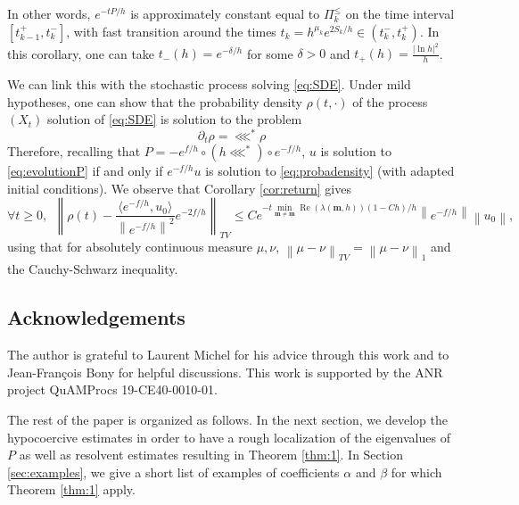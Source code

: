 \documentclass[12pt]{amsart}
\renewcommand{\Re}{\operatorname{Re}}
\def\<{\langle}
\def\>{\rangle}
\numberwithin{equation}{section}
\numberwithin{figure}{section}
\def\m{\mathbf{m}}
\def\um{\underline{\m}}
\newcommand{\vvert}[1]{\left\lVert#1\right\rVert}
\begin{document}
In other words, $e^{-tP/h}$ is approximately constant equal to $\Pi^\leq_k$ on the time interval $[t^+_{k-1},t^-_k]$, with fast transition around the times $t_k = h^{\mu_k}e^{2S_k/h}\in(t^-_k,t^+_k)$. In this corollary, one can take $t_-(h) = e^{-\delta/h}$ for some $\delta>0$ and $t_+(h) = \frac{|\ln h|^2}{h}$.

We can link this with the stochastic process solving \eqref{eq:SDE}. Under mild hypotheses, one can show that the probability density $\rho(t,\cdot)$ of the process $(X_t)$ solution of \eqref{eq:SDE} is solution to the problem
\begin{equation}\label{eq:probadensity}
\partial_t \rho = \lll^*\rho
\end{equation}
Therefore, recalling that $P = -e^{f/h}\circ(h\lll^*)\circ e^{-f/h}$, $u$ is solution to \eqref{eq:evolutionP} if and only if $e^{-f/h}u$ is solution to \eqref{eq:probadensity} (with adapted initial conditions). We observe that Corollary \ref{cor:return} gives
\begin{equation*}
\forall t\geq 0,\ \ \vvert{\rho(t) - \frac{\<e^{-f/h},u_0\>}{\vvert{e^{-f/h}}^2}e^{-2f/h}}_{TV} \leq Ce^{-t\underset{\m\neq\um}{\min}\Re(\lambda(\m,h))(1-Ch)/h}\vvert{e^{-f/h}}\vvert{u_0},
\end{equation*}
using that for absolutely continuous measure $\mu,\nu$, $\vvert{\mu-\nu}_{TV} = \vvert{\mu-\nu}_1$ and the %
Cauchy-Schwarz inequality.



\subsection*{Acknowledgements}
The author is grateful to Laurent Michel for his advice through this work and to Jean-François Bony %
for helpful discussions. This work is supported by the ANR project QuAMProcs 19-CE40-0010-01.

The rest of the paper is organized as follows. In the next section, we develop the hypocoercive estimates in order to have a rough localization of the eigenvalues of $P$ as well as resolvent estimates resulting in Theorem \ref{thm:1}. In Section \ref{sec:examples}, we give a short list of examples of coefficients $\alpha$ and $\beta$ for which Theorem \ref{thm:1} apply.
\end{document}
